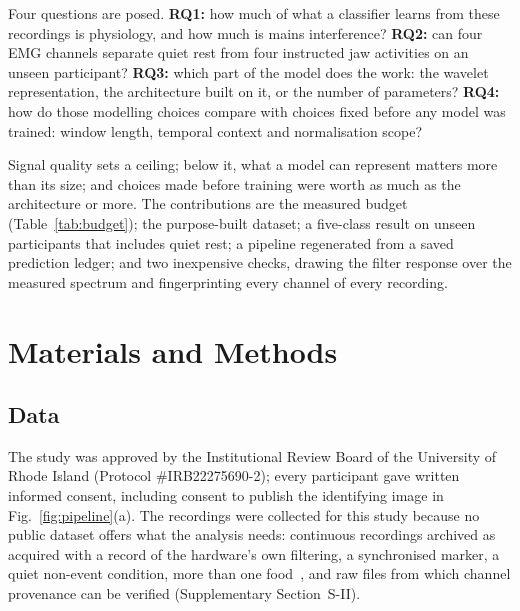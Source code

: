 \documentclass[journal]{IEEEtran}
\begin{document}
Four questions are posed. \textbf{RQ1:} how much of what a classifier learns from these recordings is physiology, and how much is mains interference? \textbf{RQ2:} can four EMG channels separate quiet rest from four instructed jaw activities on an unseen participant? \textbf{RQ3:} which part of the model does the work: the wavelet representation, the architecture built on it, or the number of parameters? \textbf{RQ4:} how do those modelling choices compare with choices fixed before any model was trained: window length, temporal context and normalisation scope?

Signal quality sets a ceiling; below it, what a model can represent matters more than its size; and choices made before training were worth as much as the architecture or more. The contributions are the measured budget (Table~\ref{tab:budget}); the purpose-built dataset; a five-class result on unseen participants that includes quiet rest; a pipeline regenerated from a saved prediction ledger; and two inexpensive checks, drawing the filter response over the measured spectrum and fingerprinting every channel of every recording.

\section{Materials and Methods}

\subsection{Data}
\label{sec:data}

The study was approved by the Institutional Review Board of the University of Rhode Island (Protocol \#IRB22275690-2); every participant gave written informed consent, including consent to publish the identifying image in Fig.~\ref{fig:pipeline}(a). The recordings were collected for this study because no public dataset offers what the analysis needs: continuous recordings archived as acquired with a record of the hardware's own filtering, a synchronised marker, a quiet non-event condition, more than one food~\cite{zhang2018monitoring}, and raw files from which channel provenance can be verified (Supplementary Section~S-II).
\end{document}
